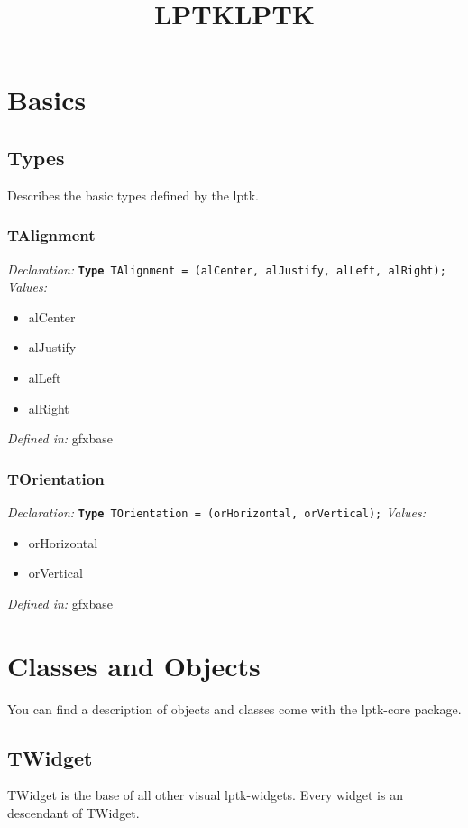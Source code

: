 \documentclass{book}
\title{LPTK}
\begin{document}
\title{LPTK}
\maketitle
\chapter[Basics]{Basics}
\section[Types]{Types}
Describes the basic types defined by the lptk.
\subsection[TAlignment]{TAlignment}
\textit{Declaration:} \texttt{\textbf{Type} TAlignment = (alCenter, alJustify, alLeft, alRight);}\newline
\textit{Values:}
\begin{itemize}
    \item alCenter
    \item alJustify
    \item alLeft
    \item alRight
\end{itemize}
\textit{Defined in:} gfxbase

\subsection[TOrientation]{TOrientation}
\textit{Declaration:} \texttt{\textbf{Type} TOrientation = (orHorizontal, orVertical);}\newline
\textit{Values:}
\begin{itemize}
    \item orHorizontal
    \item orVertical
\end{itemize}
\textit{Defined in:} gfxbase

\chapter[Classes and Objects]{Classes and Objects}
You can find a description of objects and classes come with the lptk-core package.

\section[TWidget]{TWidget}
TWidget is the base of all other visual lptk-widgets. Every widget is an descendant of TWidget.
\end{document}
